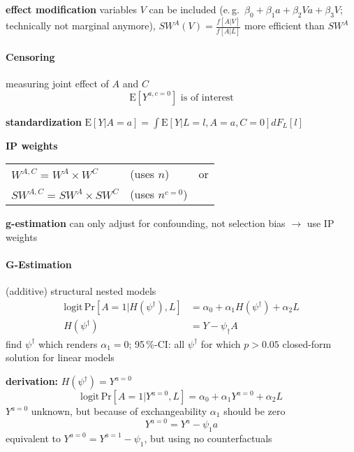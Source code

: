 \documentclass[8pt,oneside]{extarticle}
\begin{document}
\begin{multicols}{2}
\noindent \textbf{effect modification} variables $V$ can be included (e.\,g.\ $\beta_0+\beta_1 a+\beta_2 V a + \beta_3 V$; technically not marginal anymore), $SW^A(V) = \frac{f\left[A|V\right]}{f\left[A|L\right]}$ more efficient than $SW^A$
 

\paragraph{\large Censoring} measuring joint effect of $A$ and $C$
$$\mathrm{E}\left[Y^{a, c=0}\right] \text{ is of interest}$$

\noindent \textbf{standardization} $\mathrm{E}\left[Y|A=a\right] = \int \mathrm{E}\left[Y|L{=}l, A{=}a, C{=}0\right]dF_L\left[l\right]$\vspace{0.2em}

\noindent \textbf{IP weights}\vspace{-1.30em}

\hspace{3.5em}\begin{tabular}{l l l}
$W^{A,C}=W^A \times W^C$  &(uses $n$) & or \\
$SW^{A,C}=SW^A \times SW^C$ &(uses $n^{c=0}$) & 
\end{tabular}\vspace{0.3em}

\noindent \textbf{g-estimation} can only adjust for confounding, not selection bias $\rightarrow$ use IP weights






\paragraph{\large G-Estimation} (additive) structural nested models %
\begin{align*}
\mathrm{logit} \, \mathrm{Pr}\left[A=1|H(\psi^\dagger), L\right] &= \alpha_0 + \alpha_1H(\psi^\dagger) + \alpha_2L \\
H(\psi^\dagger) &= Y - \psi_\dagger A
\end{align*}
find $\psi^\dagger$ which renders $\alpha_1=0$; 95\,\%-CI: all $\psi^\dagger$ for which $p>0.05$
closed-form solution for linear models


\noindent \textbf{derivation:} $H(\psi^\dagger) = Y^{a=0}$
$$\mathrm{logit} \, \mathrm{Pr}\left[A=1|Y^{a=0}, L\right] = \alpha_0 + \alpha_1Y^{a=0} + \alpha_2L$$
$Y^{a=0}$ unknown, but because of exchangeability $\alpha_1$ should be zero
$$Y^{a=0} =Y^a - \psi_1 a$$
equivalent to $Y^{a=0} =Y^{a=1} - \psi_1$, but using no counterfactuals




\end{multicols}
\end{document}
